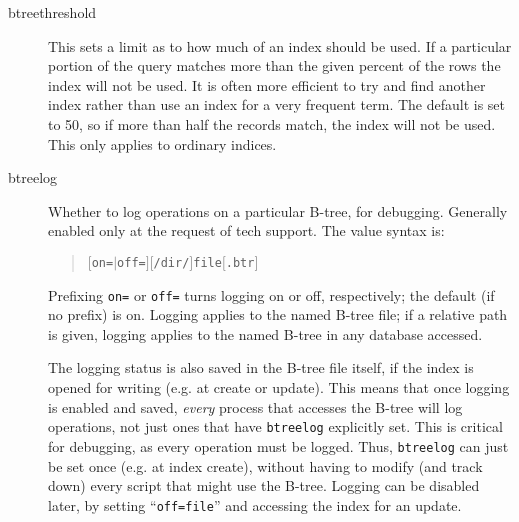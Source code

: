\begin{description}
\item[btreethreshold] This sets a limit as to how much of an index should
be used.  If a particular portion of the query matches more than the given
percent of the rows the index will not be used.  It is often more efficient
to try and find another index rather than use an index for a very frequent
term.  The default is set to 50, so if more than half the records match,
the index will not be used.  This only applies to ordinary indices.

\item[btreelog] Whether to log operations on a particular B-tree, for
  debugging.  Generally enabled only at the request of tech support.
  The value syntax is:
\begin{quote}
$[$\verb`on=`$|$\verb`off=`$][$\verb`/dir/`$]$\verb`file`$[$\verb`.btr`$]$
\end{quote}
Prefixing \verb`on=` or \verb`off=` turns logging on or off,
respectively; the default (if no prefix) is on.  Logging applies to
the named B-tree file; if a relative path is given, logging applies to
the named B-tree in any database accessed.

  The logging status is also saved in the B-tree file itself, if the
index is opened for writing (e.g. at create or update).  This means
that once logging is enabled and saved, {\em every} process that
accesses the B-tree will log operations, not just ones that have
\verb`btreelog` explicitly set.  This is critical for debugging, as
every operation must be logged.  Thus, \verb`btreelog` can just be set
once (e.g. at index create), without having to modify (and track down)
every script that might use the B-tree.  Logging can be disabled
later, by setting ``\verb`off=file`'' and accessing the index for an
update.


\end{description}

